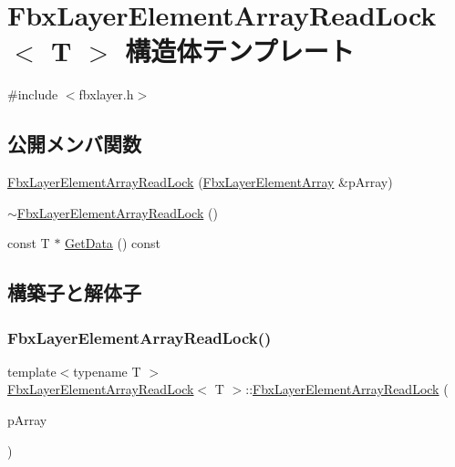 \hypertarget{struct_fbx_layer_element_array_read_lock}{}\section{Fbx\+Layer\+Element\+Array\+Read\+Lock$<$ T $>$ 構造体テンプレート}
\label{struct_fbx_layer_element_array_read_lock}


{\ttfamily \#include $<$fbxlayer.\+h$>$}

\subsection*{公開メンバ関数}
\begin{DoxyCompactItemize}
\item 
\hyperlink{struct_fbx_layer_element_array_read_lock_a84d79db20cbfae99cc9fd44c66330f2d}{Fbx\+Layer\+Element\+Array\+Read\+Lock} (\hyperlink{class_fbx_layer_element_array}{Fbx\+Layer\+Element\+Array} \&p\+Array)
\item 
\hyperlink{struct_fbx_layer_element_array_read_lock_ab1e67ef56df73649cc41c66f88b29116}{$\sim$\+Fbx\+Layer\+Element\+Array\+Read\+Lock} ()
\item 
const T $\ast$ \hyperlink{struct_fbx_layer_element_array_read_lock_aad710280b9db22c282672ab5d193169d}{Get\+Data} () const
\end{DoxyCompactItemize}


\subsection{構築子と解体子}
\mbox{\label{struct_fbx_layer_element_array_read_lock_a84d79db20cbfae99cc9fd44c66330f2d}} 
\subsubsection{\texorpdfstring{Fbx\+Layer\+Element\+Array\+Read\+Lock()}{FbxLayerElementArrayReadLock()}}
{\footnotesize\ttfamily template$<$typename T $>$ \\
\hyperlink{struct_fbx_layer_element_array_read_lock}{Fbx\+Layer\+Element\+Array\+Read\+Lock}$<$ T $>$\+::\hyperlink{struct_fbx_layer_element_array_read_lock}{Fbx\+Layer\+Element\+Array\+Read\+Lock} (\begin{DoxyParamCaption}\item[{\hyperlink{class_fbx_layer_element_array}{Fbx\+Layer\+Element\+Array} \&}]{p\+Array }\end{DoxyParamCaption})}

